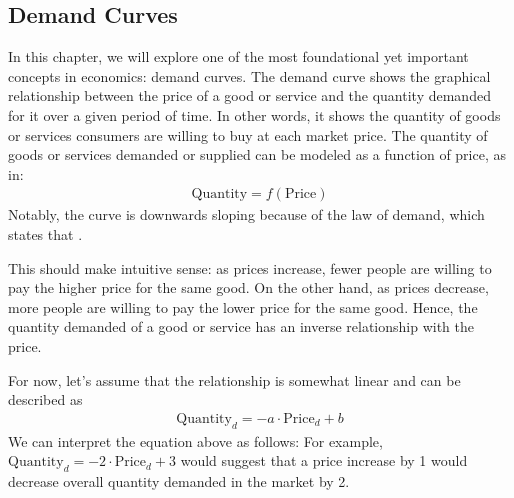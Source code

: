 \documentclass[letterpaper,10pt,english]{jupyterBook}
\begin{document}
\subsection{Demand Curves}
\label{\detokenize{content/01-demand/01-demand:demand-curves}}\label{\detokenize{content/01-demand/01-demand::doc}}
\sphinxAtStartPar
In this chapter, we will explore one of the most foundational yet important concepts in economics: demand curves. The demand curve shows the graphical relationship between the price of a good or service and the quantity demanded for it over a given period of time.
In other words, it shows the quantity of goods or services consumers are willing to buy at each market price.
The quantity of goods or services demanded or supplied can be modeled as a function of price, as in:
\begin{equation*}
\begin{split}\text{Quantity} = f(\text{Price})\end{split}
\end{equation*}
\sphinxAtStartPar
Notably, the curve is downwards sloping because of the law of demand, which states that .

\sphinxAtStartPar
This should make intuitive sense: as prices increase, fewer people are willing to pay the higher price for the same good. On the other hand, as prices decrease, more people are willing to pay the lower price for the same good. Hence, the quantity demanded of a good or service has an inverse relationship with the price.

\sphinxAtStartPar
For now, let’s assume that the relationship is somewhat linear and can be described as
\begin{equation*}
\begin{split}\text{Quantity}_{d}=-a \cdot \text{Price}_{d} + b\end{split}
\end{equation*}
\sphinxAtStartPar
We can interpret the equation above as follows:  For example, \(\text{Quantity}_{d}=-2 \cdot \text{Price}_{d} + 3\) would suggest that a price increase by 1 would decrease overall quantity demanded in the market by 2.
\end{document}
